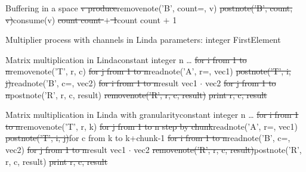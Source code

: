\begin{wideslide}[bm=,toc=]{\large }
\begin{alg}{Buffering in a space}{}\hline
{}
\st{\idt{}v \la{} produce}{\idt{}removenote('B', count=, v)}
\st{\idt{}postnote('B', count, v)}{\idt{}consume(v)}
\st{\idt{}count \la{} count $+$ 1}{\idt{}count \la{} count $+$ 1}
\end{alg}
\end{wideslide}

\begin{wideslide}[bm=,toc=]{\large }
\begin{alg}{Multiplier process with channels in Linda}%
{parameters: integer FirstElement}
\hline
{}\hline
{}
\end{alg}
\end{wideslide}

\begin{wideslide}[bm=,toc=]{\large }
\begin{alg}{Matrix multiplication in Linda}{constant integer n \la{} \ldots}\hline
{}
\st{for i from 1 to n}{\idt{}removenote('T', r, c)}
\st{\idt{}for j from 1 to n}{\idt{}readnote('A', r=, vec1)}
\st{\idt{}\idt{}postnote('T', i, j)}{\idt{}readnote('B', c=, vec2)}
\st{for i from 1 to n}{\idt{}result \la{} vec1 $\cdot$ vec2}
\st{\idt{}for j from 1 to n}{\idt{}postnote('R', r, c, result)}
\st{\idt{}\idt{}removenote('R', r, c, result)}{}
\st{\idt{}\idt{}print r, c, result}{}
\end{alg}
\end{wideslide}

\begin{wideslide}[bm=,toc=]{\large }
\begin{alg}{Matrix multiplication in Linda with granularity}{constant integer n \la{} \ldots}
\hline
{}
\st{for i from 1 to n}{\idt{}removenote('T', r, k)}
\st{\idt{}for j from 1 to n step by chunk}{\idt{}readnote('A', r=, vec1)}
\st{\idt{}\idt{}postnote('T', i, j)}{\idt{}for c from k to k+chunk-1}
\st{for i from 1 to n}{\idt{}\idt{}readnote('B', c=, vec2)}
\st{\idt{}for j from 1 to n}{\idt{}\idt{}result \la{} vec1 $\cdot$ vec2}
\st{\idt{}\idt{}removenote('R', r, c, result)}{\idt{}\idt{}postnote('R', r, c, result)}
\st{\idt{}\idt{}print r, c, result}{}
\end{alg}
\end{wideslide}

